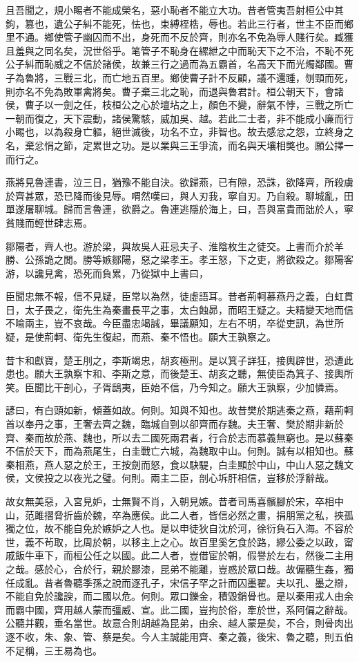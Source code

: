 且吾聞之，規小睗者不能成榮名，惡小恥者不能立大功。昔者管夷吾射桓公中其鉤，篡也，遺公子糾不能死，怯也，束縛桎梏，辱也。若此三行者，世主不臣而鄉里不通。鄉使管子幽囚而不出，身死而不反於齊，則亦名不免為辱人賤行矣。臧獲且羞與之同名矣，況世俗乎。笔管子不恥身在縲紲之中而恥天下之不治，不恥不死公子糾而恥威之不信於諸侯，故兼三行之過而為五霸首，名高天下而光燭鄰國。曹子為魯將，三戰三北，而亡地五百里。鄉使曹子計不反顧，議不還踵，刎頸而死，則亦名不免為敗軍禽將矣。曹子棄三北之恥，而退與魯君計。桓公朝天下，會諸侯，曹子以一劍之任，枝桓公之心於壇坫之上，顏色不變，辭氣不悖，三戰之所亡一朝而復之，天下震動，諸侯驚駭，威加吳、越。若此二士者，非不能成小廉而行小睗也，以為殺身亡軀，絕世滅後，功名不立，非智也。故去感忿之怨，立終身之名，棄忿悁之節，定累世之功。是以業與三王爭流，而名與天壤相獘也。願公擇一而行之。

燕將見魯連書，泣三日，猶豫不能自決。欲歸燕，已有隙，恐誅，欲降齊，所殺虜於齊甚眾，恐已降而後見辱。喟然嘆曰，與人刃我，寧自刃。乃自殺。聊城亂，田單遂屠聊城。歸而言魯連，欲爵之。魯連逃隱於海上，曰，吾與富貴而詘於人，寧貧賤而輕世肆志焉。

鄒陽者，齊人也。游於梁，與故吳人莊忌夫子、淮陰枚生之徒交。上書而介於羊勝、公孫詭之閒。勝等嫉鄒陽，惡之梁孝王。孝王怒，下之吏，將欲殺之。鄒陽客游，以讒見禽，恐死而負累，乃從獄中上書曰，

臣聞忠無不報，信不見疑，臣常以為然，徒虛語耳。昔者荊軻慕燕丹之義，白虹貫日，太子畏之，衛先生為秦畫長平之事，太白蝕昴，而昭王疑之。夫精變天地而信不喻兩主，豈不哀哉。今臣盡忠竭誠，畢議願知，左右不明，卒從吏訊，為世所疑，是使荊軻、衛先生復起，而燕、秦不悟也。願大王孰察之。

昔卞和獻寶，楚王刖之，李斯竭忠，胡亥極刑。是以箕子詳狂，接輿辟世，恐遭此患也。願大王孰察卞和、李斯之意，而後楚王、胡亥之聽，無使臣為箕子、接輿所笑。臣聞比干剖心，子胥鴟夷，臣始不信，乃今知之。願大王孰察，少加憐焉。

諺曰，有白頭如新，傾蓋如故。何則。知與不知也。故昔樊於期逃秦之燕，藉荊軻首以奉丹之事，王奢去齊之魏，臨城自剄以卻齊而存魏。夫王奢、樊於期非新於齊、秦而故於燕、魏也，所以去二國死兩君者，行合於志而慕義無窮也。是以蘇秦不信於天下，而為燕尾生，白圭戰亡六城，為魏取中山。何則。誠有以相知也。蘇秦相燕，燕人惡之於王，王按劍而怒，食以駃騠，白圭顯於中山，中山人惡之魏文侯，文侯投之以夜光之璧。何則。兩主二臣，剖心坼肝相信，豈移於浮辭哉。

故女無美惡，入宮見妒，士無賢不肖，入朝見嫉。昔者司馬喜髕腳於宋，卒相中山，范雎摺脅折齒於魏，卒為應侯。此二人者，皆信必然之畫，捐朋黨之私，挾孤獨之位，故不能自免於嫉妒之人也。是以申徒狄自沈於河，徐衍負石入海。不容於世，義不茍取，比周於朝，以移主上之心。故百里奚乞食於路，繆公委之以政，甯戚飯牛車下，而桓公任之以國。此二人者，豈借宦於朝，假譽於左右，然後二主用之哉。感於心，合於行，親於膠漆，昆弟不能離，豈惑於眾口哉。故偏聽生姦，獨任成亂。昔者魯聽季孫之說而逐孔子，宋信子罕之計而囚墨翟。夫以孔、墨之辯，不能自免於讒諛，而二國以危。何則。眾口鑠金，積毀銷骨也。是以秦用戎人由余而霸中國，齊用越人蒙而彊威、宣。此二國，豈拘於俗，牽於世，系阿偏之辭哉。公聽并觀，垂名當世。故意合則胡越為昆弟，由余、越人蒙是矣，不合，則骨肉出逐不收，朱、象、管、蔡是矣。今人主誠能用齊、秦之義，後宋、魯之聽，則五伯不足稱，三王易為也。

